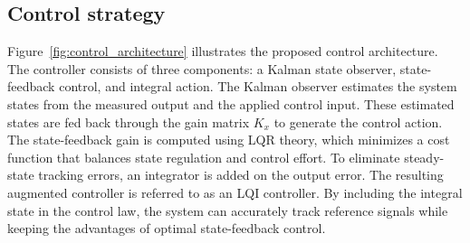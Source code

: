 \documentclass[12pt,a4paper]{article}
\begin{document}
\subsection{Control strategy}
Figure~\ref{fig:control_architecture} illustrates the proposed control architecture. The controller consists of three components: a Kalman state observer, state-feedback control, and integral action. The Kalman observer estimates the system states from the measured output and the applied control input. These estimated states are fed back through the gain matrix $K_x$ to generate the control action. The state-feedback gain is computed using LQR theory, which minimizes a cost function that balances state regulation and control effort. To eliminate steady-state tracking errors, an integrator is added on the output error. The resulting augmented controller is referred to as an LQI controller. By including the integral state in the control law, the system can accurately track reference signals while keeping the advantages of optimal state-feedback control.
\end{document}
